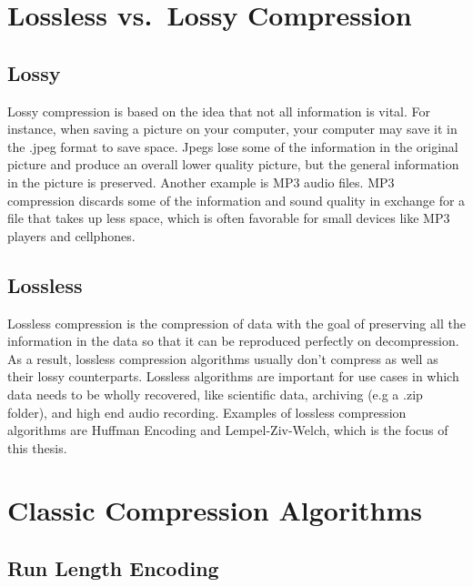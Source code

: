 \documentclass[12pt,twoside]{reedthesis}
\begin{document}
\hypertarget{lossless-vs.-lossy-compression}{%
\section{Lossless vs.~Lossy Compression}\label{lossless-vs.-lossy-compression}}

\hypertarget{lossy}{%
\subsection{Lossy}\label{lossy}}

Lossy compression is based on the idea that not all information is vital. For instance, when saving a picture on your computer, your computer may save it in the .jpeg format to save space. Jpegs lose some of the information in the original picture and produce an overall lower quality picture, but the general information in the picture is preserved. Another example is MP3 audio files. MP3 compression discards some of the information and sound quality in exchange for a file that takes up less space, which is often favorable for small devices like MP3 players and cellphones.

\hypertarget{lossless}{%
\subsection{Lossless}\label{lossless}}

Lossless compression is the compression of data with the goal of preserving all the information in the data so that it can be reproduced perfectly on decompression. As a result, lossless compression algorithms usually don't compress as well as their lossy counterparts. Lossless algorithms are important for use cases in which data needs to be wholly recovered, like scientific data, archiving (e.g a .zip folder), and high end audio recording. Examples of lossless compression algorithms are Huffman Encoding and Lempel-Ziv-Welch, which is the focus of this thesis.

\hypertarget{classic-compression-algorithms}{%
\section{Classic Compression Algorithms}\label{classic-compression-algorithms}}

\hypertarget{run-length-encoding}{%
\subsection{Run Length Encoding}\label{run-length-encoding}}
\end{document}
